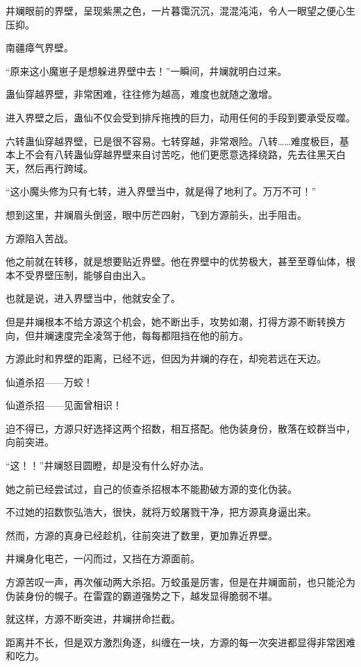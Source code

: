 \begin{this_body}
井斓眼前的界壁，呈现紫黑之色，一片暮霭沉沉，混混沌沌，令人一眼望之便心生压抑。

南疆瘴气界壁。

“原来这小魔崽子是想躲进界壁中去！”一瞬间，井斓就明白过来。

蛊仙穿越界壁，非常困难，往往修为越高，难度也就随之激增。

进入界壁之后，蛊仙不仅会受到排斥拖拽的巨力，动用任何的手段到要承受反噬。

六转蛊仙穿越界壁，已是很不容易。七转穿越，非常艰险。八转……难度极巨，基本上不会有八转蛊仙穿越界壁来自讨苦吃，他们更愿意选择绕路，先去往黑天白天，然后再行跨域。

“这小魔头修为只有七转，进入界壁当中，就是得了地利了。万万不可！”

想到这里，井斓眉头倒竖，眼中厉芒四射，飞到方源前头，出手阻击。

方源陷入苦战。

他之前就在转移，就是想要贴近界壁。他在界壁中的优势极大，甚至至尊仙体，根本不受界壁压制，能够自由出入。

也就是说，进入界壁当中，他就安全了。

但是井斓根本不给方源这个机会，她不断出手，攻势如潮，打得方源不断转换方向，但井斓速度完全凌驾于他，每每都阻挡在他的前方。

方源此时和界壁的距离，已经不远，但因为井斓的存在，却宛若远在天边。

仙道杀招——万蛟！

仙道杀招——见面曾相识！

迫不得已，方源只好选择这两个招数，相互搭配。他伪装身份，散落在蛟群当中，向前突进。

“这！！”井斓怒目圆瞪，却是没有什么好办法。

她之前已经尝试过，自己的侦查杀招根本不能勘破方源的变化伪装。

不过她的招数恢弘浩大，很快，就将万蛟屠戮干净，把方源真身逼出来。

然而，方源的真身已经趁机，往前突进了数里，更加靠近界壁。

井斓身化电芒，一闪而过，又挡在方源面前。

方源苦叹一声，再次催动两大杀招。万蛟虽是厉害，但是在井斓面前，也只能沦为伪装身份的幌子。在雷霆的霸道强势之下，越发显得脆弱不堪。

就这样，方源不断突进，井斓拼命拦截。

距离并不长，但是双方激烈角逐，纠缠在一块，方源的每一次突进都显得非常困难和吃力。


\end{this_body}
